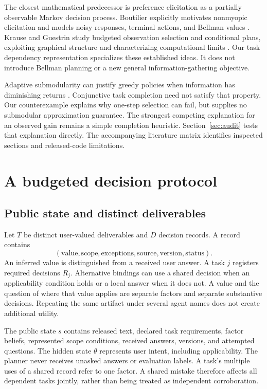 \documentclass[11pt]{article}
\begin{document}
The closest mathematical predecessor is preference elicitation as a partially observable Markov decision process. Boutilier explicitly motivates nonmyopic elicitation and models noisy responses, terminal actions, and Bellman values \citep{boutilier2002elicitation}. Krause and Guestrin study budgeted observation selection and conditional plans, exploiting graphical structure and characterizing computational limits \citep{krause2005nonmyopic}. Our task dependency representation specializes these established ideas. It does not introduce Bellman planning or a new general information-gathering objective.

Adaptive submodularity can justify greedy policies when information has diminishing returns \citep{golovin2011adaptive}. Conjunctive task completion need not satisfy that property. Our counterexample explains why one-step selection can fail, but supplies no submodular approximation guarantee. The strongest competing explanation for an observed gain remains a simple completion heuristic. Section~\ref{sec:audit} tests that explanation directly. The accompanying literature matrix identifies inspected sections and released-code limitations.

\section{A budgeted decision protocol}
\subsection{Public state and distinct deliverables}
Let $T$ be distinct user-valued deliverables and $D$ decision records. A record contains
\[
(\text{value},\text{scope},\text{exceptions},\text{source},\text{version},\text{status}).
\]
An inferred value is distinguished from a received user answer. A task $j$ registers required decisions $R_j$. Alternative bindings can use a shared decision when an applicability condition holds or a local answer when it does not. A value and the question of where that value applies are separate factors and separate substantive decisions. Repeating the same artifact under several agent names does not create additional utility.

The public state $s$ contains released text, declared task requirements, factor beliefs, represented scope conditions, received answers, versions, and attempted questions. The hidden state $\theta$ represents user intent, including applicability. The planner never receives unasked answers or evaluation labels. A task's multiple uses of a shared record refer to one factor. A shared mistake therefore affects all dependent tasks jointly, rather than being treated as independent corroboration.
\end{document}

